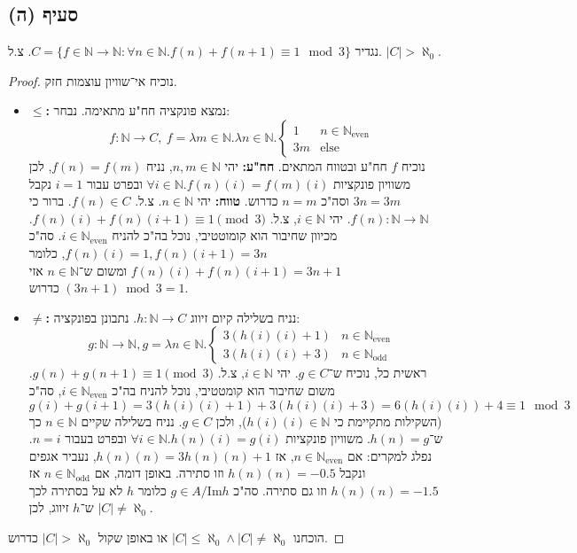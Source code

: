 \documentclass[]{article}
\newcommand\N     {\mathbb{N}}
\newcommand\Neven {\N_{\mathrm{even}}}
\newcommand\Nodd  {\N_{\mathrm{odd }}}
\newcommand\other {\text{else}}
\newcommand\Img   {\text{Im}}
\newcommand\az    {\aleph_0}
\begin{document}
	\subsection*{סעיף (ה)}
	נגדיר $ C = \{f \in \N \to \N \colon \forall n \in \N. f(n) + f(n + 1) \equiv 1 \mod 3\} $. צ.ל. $ |C| > \az $. 
	\begin{proof}
		נוכיח אי־שוויון עוצמות חזק. 
		\begin{itemize}
			\item $ \bm{\le} $\textbf{: }נמצא פונקציה חח"ע מתאימה. נבחר: 
			\[ f \colon \N \to C, \ f = \lambda m \in \N. \lambda n \in \N. \begin{cases}
				 1 &n \in \Neven \\
				 3m &\other
			\end{cases} \]
			נוכיח $ f $ חח"ע ובטווח המתאים. \textbf{חח"ע: }יהי $ n, m \in \N $, נניח $ f(n) = f(m) $, לכן משוויון פונקציות $ \forall i \in \N. f(n)(i) = f(m)(i) $ ובפרט עבור $ i = 1  $ נקבל $ 3n = 3m $ וסה"כ $ n = m $ כדרוש. \textbf{טווח: }יהי $ n \in \N $. צ.ל. $ f(n) \in C $. ברור כי $ f(n) \colon \N \to \N $. יהי $ i \in \N $, צ.ל. $ f(n)(i) + f(n)(i + 1) \equiv 1 \pmod 3 $. מכיוון שחיבור הוא קומוטטיבי, נוכל בה"כ להניח $ i \in \Neven $. סה"כ $ f(n)(i) = 1, f(n)(i + 1) = 3n $, כלומר $ f(n)(i) + f(n)(i + 1) = 3n + 1 $ ומשום ש־$ n \in \N $ אזי $ (3n + 1)\bmod 3 = 1 $ כדרוש. 
			\item $ \bm{\neq} $\textbf{: }נניח בשלילה קיום זיווג $ h \colon \N \to C $. נתבונן בפונקציה: 
			\[ g \colon \N \to \N, g = \lambda n \in \N. \begin{cases}
				3(h(i)(i) + 1) &n \in \Neven \\
				3(h(i)(i) + 3 ) &n \in \Nodd
			\end{cases} \]
		ראשית כל, נוכיח ש־$ g \in C $. יהי $ i \in \N $, צ.ל. $ g(n) + g(n + 1) \equiv 1 \pmod 3 $. משום שחיבור הוא קומטטיבי, נוכל להניח בה"כ $ i \in \Neven $, סה"כ
		$ g(i) + g(i + 1) = 3(h(i)(i) + 1) + 3(h(i)(i) + 3) = 6(h(i)(i)) + 4 \equiv 1 \mod 3 $
		(השקילות מתקיימת כי $ h(i)(i) \in \N $), ולכן $ g \in C $. נניח בשלילה שקיים $ n \in \N $ כך ש־$ h(n) = g $. משוויון פונקציות $ \forall i \in \N. h(n)(i) = g(i) $ ובפרט בעבור $ n = i $. נפלג למקרים: אם $ n \in \Neven $, אז $ h(n)(n) = 3h(n)(n) + 1 $, נעביר אגפים ונקבל $ h(n)(n) = -0.5 $ וזו סתירה. באופן דומה, אם $ n \in \Nodd $ אז $ h(n)(n) = -1.5 $ וזו גם סתירה. סה"כ $ g \in A / \Img h $ כלומר $ h $ לא על בסתירה לכך ש־$ h $ זיווג, לכן $ |C| \neq \az $. 
		\end{itemize}
	הוכחנו $ |C| \le \az \land |C| \neq \az  $ או באופן שקול $ |C| > \az $ כדרוש. 
	\end{proof}
\end{document}
